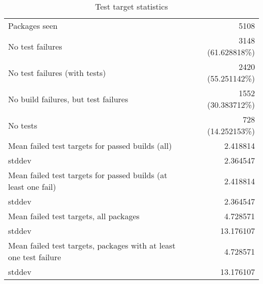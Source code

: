 \begin{table}[ht]
\caption{Test target statistics}
\label{table:test}
\begin{tabular}{|l|r|}
 \hline
  Packages seen & 5108 \\
  No test failures & 3148 (61.628818\%) \\
  No test failures (with tests) & 2420 (55.251142\%) \\
  No build failures, but test failures & 1552 (30.383712\%) \\
  No tests & 728 (14.252153\%) \\
 \hline
  Mean failed test targets for passed builds (all) & 2.418814 \\
  stddev & 2.364547 \\
 \hline
  Mean failed test targets for passed builds (at least one fail) & 2.418814 \\
  stddev & 2.364547 \\
 \hline
  Mean failed test targets, all packages& 4.728571 \\
  stddev & 13.176107 \\
 \hline
  Mean failed test targets, packages with at least one test failure& 4.728571 \\
  stddev & 13.176107 \\
 \hline
\end{tabular}
\end{table}


